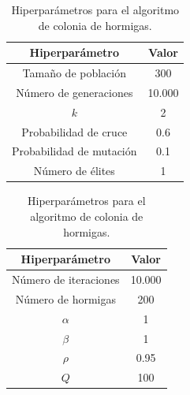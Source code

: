 \begin{table}[H]
    \centering
    \renewcommand{\arraystretch}{1.3}

    \begin{minipage}{0.48\textwidth}
        \centering
        \caption{Hiperparámetros para el algoritmo genético.}
        \label{tab:ga_hyperparams}

        \begin{tabular}{|c|c|}
            \hline
            \textbf{Hiperparámetro} & \textbf{Valor} \\
            \hline
            Tamaño de población & 300 \\
            \hline
            Número de generaciones & 10.000 \\
            \hline
            $k$ & 2 \\
            \hline
            Probabilidad de cruce & 0.6 \\
            \hline
            Probabilidad de mutación & 0.1 \\
            \hline
            Número de élites & 1 \\
            \hline
        \end{tabular}
    \end{minipage}
    \hfill
    \begin{minipage}{0.48\textwidth}
        \centering
        \caption{Hiperparámetros para el algoritmo de colonia de hormigas.}
        \label{tab:aco_hyperparams}

        \begin{tabular}{|c|c|}
            \hline
            \textbf{Hiperparámetro} & \textbf{Valor} \\
            \hline
            Número de iteraciones & 10.000 \\
            \hline
            Número de hormigas & 200 \\
            \hline
            $\alpha$ & 1 \\
            \hline
            $\beta$ & 1 \\
            \hline
            $\rho$ & 0.95 \\
            \hline
            $Q$ & 100 \\
            \hline
        \end{tabular}
    \end{minipage}

\end{table}

